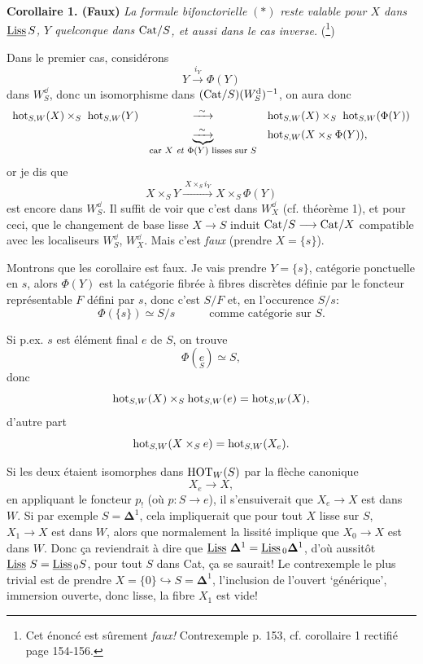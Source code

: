 \textbf{Corollaire 1. (Faux)} \textit{La formule bifonctorielle} $(*)$ \textit{reste valable pour $X$ dans} $\underline{\mathrm{Liss}}\, S$\textit{, $Y$ quelconque dans} $\mathrm{Cat}/S$\textit{, et aussi dans le cas inverse.} (\footnote[73]{Cet énoncé est sûrement \textit{faux!} Contrexemple p. 153, cf. corollaire 1 rectifié page 154-156.})

Dans le premier cas, considérons
\[
Y \xrightarrow{i_Y} \Phi(Y)
\]
dans $W^{\dd}_S$, donc un isomorphisme dans $(\mathrm{Cat}/S)(W^{\mathrm{d}}_S)^{-1}$, on aura donc
\[
\begin{array}{lcl}
\mathrm{hot}_{S,W}(X) \times_S\ \mathrm{hot}_{S,W}(Y) & \xrightarrow{\ \sim\ } & \mathrm{hot}_{S,W}(X) \times_S\ \mathrm{hot}_{S,W}(\Phi(Y)) \\[1ex]
 & \underbrace{\xrightarrow{\ \sim\ }}_{\text{\footnotesize car $X$ \textit{et} $\Phi(Y)$ lisses sur $S$}} & \mathrm{hot}_{S,W}(X \times_S \Phi(Y)),
\end{array}
\]
or je dis que
\[
X \times_S Y \xrightarrow{\ X\times_S i_Y\ } X \times_S \Phi(Y)
\]
est encore dans $W^{\dd}_S$. Il suffit de voir que c'est dans $W^{\dd}_X$ (cf. théorème 1), et pour ceci, que le changement de base lisse $X \longrightarrow S$ induit $\mathrm{Cat}/S \longrightarrow \mathrm{Cat}/X$ compatible avec les localiseurs $W^{\dd}_S$, $W^{\dd}_X$. Mais c'est \textit{faux} (prendre $X = \{s\}$).

Montrons que les corollaire est faux. Je vais prendre $Y = \{s\}$, catégorie ponctuelle en $s$, alors $\Phi(Y)$ est la catégorie fibrée à fibres discrètes définie par le foncteur représentable $F$ défini par $s$, donc c'est $S/F$ et, en l'occurence $S/s$: %
\[
\Phi(\{s\}) \simeq S/s \qquad\quad \text{comme catégorie sur } S.
\]


Si p.ex. $s$ est élément final $e$ de $S$, on trouve
\[\Phi(\underset{S}{e}) \simeq S,\]
donc
\[\mathrm{hot}_{S,W}(X)\times_S \mathrm{hot}_{S,W}(e)=\mathrm{hot}_{S,W}(X),\]
d'autre part
\[\mathrm{hot}_{S,W}(X\times_S e)=\mathrm{hot}_{S,W}(X_e).\]

Si les deux étaient isomorphes dans $\mathrm{HOT}_W(S)$ par la flèche canonique
\[X_e\longrightarrow X,\]
en appliquant le foncteur $p_!$ (où $p : S\longrightarrow e$), il s'ensuiverait que $X_e\longrightarrow X$ est dans $W$. Si par exemple $S=\mathbf{\Delta}^1$, cela impliquerait que pour tout $X$ lisse sur $S$, $X_1\longrightarrow X$ est dans $W$, alors que normalement la lissité implique que $X_0\longrightarrow X$ est dans $W$. Donc ça reviendrait à dire que $\underline{\mathrm{Liss}}\,\,\mathbf{\Delta}^1=\underline{\mathrm{Liss}}\,_0\mathbf{\Delta}^1$, d'où aussitôt $\underline{\mathrm{Liss}}\,\,S=\underline{\mathrm{Liss}}\,_0S$, pour tout $S$ dans Cat, ça se saurait! Le contrexemple le plus trivial est de prendre $X=\{0\}\hookrightarrow S=\mathbf{\Delta}^1$, l'inclusion de l'ouvert ‘générique’, immersion ouverte, donc lisse, la fibre $X_1$ est vide! %

